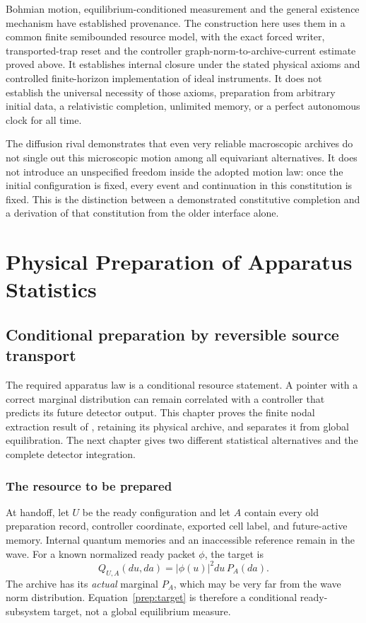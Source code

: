 \documentclass[11pt,oneside,openany]{book}
\theoremstyle{definition}
\theoremstyle{remark}\newtheorem{remark}[theorem]{Remark}
\begin{document}
Bohmian motion, equilibrium-conditioned measurement and the general
existence mechanism have established provenance. The construction here
uses them in a common finite semibounded resource model, with the exact
forced writer, transported-trap reset and the controller
graph-norm-to-archive-current estimate proved above. It establishes
internal closure under the stated physical axioms and controlled
finite-horizon implementation of ideal instruments. It does not establish
the universal necessity of those axioms, preparation from arbitrary initial
data, a relativistic completion, unlimited memory, or a perfect autonomous
clock for all time.

The diffusion rival demonstrates that even very reliable macroscopic
archives do not single out this microscopic motion among all equivariant
alternatives. It does not introduce an unspecified freedom inside the
adopted motion law: once the initial configuration is fixed, every event
and continuation in this constitution is fixed. This is the distinction
between a demonstrated constitutive completion and a derivation of that
constitution from the older interface alone.


\part{Physical Preparation of Apparatus Statistics}\label{part:preparation}

\chapter{Conditional preparation by reversible source transport}
\label{prep:deterministic}

The required apparatus law is a conditional resource statement. A pointer
with a correct marginal distribution can remain correlated with a controller
that predicts its future detector output. This chapter proves the finite
nodal extraction result of \cite{M19}, retaining its physical archive, and
separates it from global equilibration. The next chapter gives two different
statistical alternatives and the complete detector integration.

\section{The resource to be prepared}

At handoff, let $U$ be the ready configuration and let $A$ contain every
old preparation record, controller coordinate, exported cell label,
and future-active memory. Internal quantum memories and an inaccessible
reference remain in the wave. For a known normalized ready packet $\phi$,
the target is
\begin{equation}
 Q_{U,A}(du,da)=|\phi(u)|^2du\,P_A(da).
 \label{prep:target}
\end{equation}
The archive has its \emph{actual} marginal $P_A$, which may be very far
from the wave norm distribution. Equation~\eqref{prep:target} is therefore
a conditional ready-subsystem target, not a global equilibrium measure.
\end{document}
